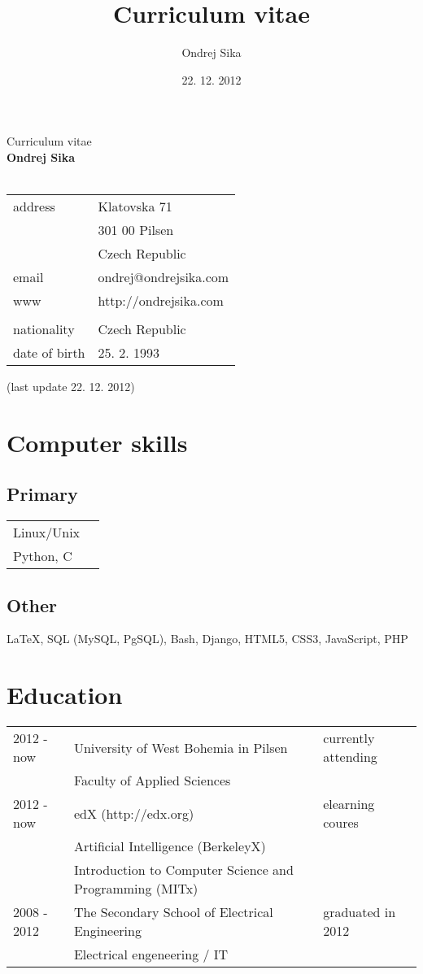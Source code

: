 \documentclass[12pt,a4paper]{article}
\title{Curriculum vitae}
\author{Ondrej Sika}
\date{22. 12. 2012}
\begin{document}
\begin{center}
{\Large Curriculum vitae}\\
\vspace*{1cm}
{\LARGE \bf Ondrej Sika}\\
\hrulefill\\
\vspace*{0.2cm}
\begin{tabular}{l l}
address & Klatovska 71\\
 & 301 00 Pilsen\\
 & Czech Republic\\
email & ondrej@ondrejsika.com\\
www & http://ondrejsika.com\\
\\
nationality & Czech Republic\\
date of birth & 25. 2. 1993\\
\end{tabular}

\vspace*{0.2cm}
{\small (last update 22. 12. 2012)}
\end{center}

\section*{Computer skills}
\subsection*{Primary}
\begin{tabular}{@{}ll}
Linux/Unix & \\
Python, C & \\
\end{tabular}

\subsection*{Other}
LaTeX, SQL (MySQL, PgSQL), Bash, Django, HTML5, CSS3, JavaScript, PHP

\section*{Education}
\begin{tabular}{@{}p{2cm}ll}
2012 - now & University of West Bohemia in Pilsen  & currently attending\\
 & Faculty of Applied Sciences & \\
2012 - now & edX (http://edx.org) & elearning coures\\
 & Artificial Intelligence (BerkeleyX) & \\
 & Introduction to Computer Science and Programming (MITx) & \\
2008 - 2012 & The Secondary School of Electrical Engineering & graduated in 2012\\
 & Electrical engeneering / IT & \\
\end{tabular}
\end{document}
